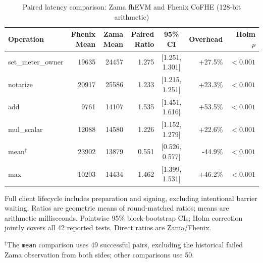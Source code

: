 \begin{table}[!t]
\caption{Paired latency comparison: Zama fhEVM and Fhenix CoFHE (128-bit arithmetic)}
\label{tab:zama-fhenix-lifecycle-comparison-128}
\centering
\footnotesize
\setlength{\tabcolsep}{5pt}
\begin{tabular}{|l|r|r|r|c|r|r|}
\hline
\textbf{Operation} & \textbf{Fhenix Mean} & \textbf{Zama Mean} & \textbf{Paired Ratio} & \textbf{95\% CI} & \textbf{Overhead} & \textbf{Holm \(p\)} \\
\hline
set\_meter\_owner & 19635 & 24457 & 1.275 & [1.251, 1.301] & +27.5\% & $<0.001$ \\
notarize & 20917 & 25586 & 1.233 & [1.215, 1.251] & +23.3\% & $<0.001$ \\
add & 9761 & 14107 & 1.535 & [1.451, 1.616] & +53.5\% & $<0.001$ \\
mul\_scalar & 12088 & 14580 & 1.226 & [1.152, 1.279] & +22.6\% & $<0.001$ \\
mean\(^{\dagger}\) & 23902 & 13879 & 0.551 & [0.526, 0.577] & -44.9\% & $<0.001$ \\
max & 10203 & 14434 & 1.462 & [1.399, 1.531] & +46.2\% & $<0.001$ \\
\hline
\end{tabular}
\vspace{2pt}
\parbox{\textwidth}{\scriptsize Full client lifecycle includes preparation and signing, excluding intentional barrier waiting. Ratios are geometric means of round-matched ratios; means are arithmetic milliseconds. Pointwise 95\% block-bootstrap CIs; Holm correction jointly covers all 42 reported tests. Direct ratios are Zama/Fhenix.}
\parbox{\textwidth}{\scriptsize \(^{\dagger}\)The \texttt{mean} comparison uses 49 successful pairs, excluding the historical failed Zama observation from both sides; other comparisons use 50.}
\end{table}
